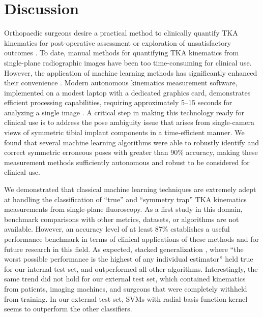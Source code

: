 {\section{Discussion}
Orthopaedic surgeons desire a practical method to clinically quantify TKA kinematics for post-operative assessment or exploration of unsatisfactory outcomes \cite{banksWhatPostoperativeOutcome2017}.
To date, manual methods for quantifying TKA kinematics from single-plane radiographic images have been too time-consuming for clinical use. However, the application of machine learning methods has significantly enhanced their convenience \cite{jensenJointTrackMachine2023}.
Modern autonomous kinematics measurement software, implemented on a modest laptop with a dedicated graphics card, demonstrates efficient processing capabilities, requiring approximately 5–15 seconds for analyzing a single image \cite{jensenJointTrackMachine2023}.
A critical step in making this technology ready for clinical use is to address the pose ambiguity issue that arises from single-camera views of symmetric tibial implant components in a time-efficient manner.
We found that several machine learning algorithms were able to robustly identify and correct symmetric erroneous poses with greater than 90\% accuracy, making these measurement methods sufficiently autonomous and robust to be considered for clinical use.

We demonstrated that classical machine learning techniques are extremely adept at handling the classification of “true” and “symmetry trap” TKA kinematics measurements from single-plane fluoroscopy.
As a first study in this domain, benchmark comparisons with other metrics, datasets, or algorithms are not available.
However, an accuracy level of at least 87\% establishes a useful performance benchmark in terms of clinical applications of these methods and for future research in this field.
As expected, stacked generalization \cite{wolpertStackedGeneralization1992,smythLinearlyCombiningDensity1999}, where “the worst possible performance is the highest of any individual estimator” held true for our internal test set, and outperformed all other algorithms.
Interestingly, the same trend did not hold for our external test set, which contained kinematics from patients, imaging machines, and surgeons that were completely withheld from training. In our external test set, SVMs with radial basis function kernel seems to outperform the other classifiers.


}
